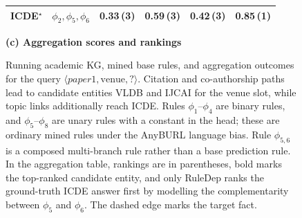 \begin{figure}[t]
\begin{minipage}[c]{0.46\textwidth}
\begin{tabular}{@{}llcccc@{}}
ICDE$^\star$ & $\phi_2,\phi_5,\phi_6$ & 0.33\,(3) & 0.59\,(3) & 0.42\,(3) & \textbf{0.85}\,(1) \\
\bottomrule
\end{tabular}
\par
\vspace{4pt}
\textbf{(c) Aggregation scores and rankings}
\end{minipage}
\caption{Running academic KG, mined base rules, and aggregation outcomes for the query $\langle \mathit{paper1}, \mathrm{venue}, ? \rangle$. Citation and co-authorship paths lead to candidate entities VLDB and IJCAI for the venue slot, while topic links additionally reach ICDE. Rules $\phi_1$--$\phi_4$ are binary rules, and $\phi_5$--$\phi_8$ are unary rules with a constant in the head; these are ordinary mined rules under the AnyBURL language bias. Rule $\phi_{5,6}$ is a composed multi-branch rule rather than a base prediction rule. In the aggregation table, rankings are in parentheses, bold marks the top-ranked candidate entity, and only RuleDep ranks the ground-truth ICDE answer first by modelling the complementarity between $\phi_5$ and $\phi_6$. The dashed edge marks the target fact.}
\label{fig:mag_rules_example}
\end{figure}